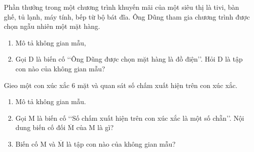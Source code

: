 \begin{vd}%
	Phần thưởng trong một chương trình khuyến mãi của một siêu thị là tivi, bàn ghế, tủ lạnh, máy tính, bếp từ bộ bát đĩa. Ông Dũng tham gia chương trình được chọn ngẫu nhiên một mặt hàng.
	\begin{enumerate}
		\item Mô tả không gian mẫu,
		\item Gọi $ \mathrm{D} $ là biến cố \lq\lq  Ông Dũng được chọn mặt hàng là đồ điện\rq\rq. Hỏi $ \mathrm{D} $ là tập con nào của không gian mẫu?
	\end{enumerate}
\end{vd}

\begin{vd}%
	Gieo một con xúc xắc $ 6 $ mặt và quan sát số chấm xuất hiện trên con xúc xắc.
	\begin{enumerate}
		\item Mô tả không gian mẫu.
		\item Gọi $ \mathrm{M} $ là biến cố \lq\lq  Số chấm xuất hiện trên con xúc xắc là một số chẵn\rq\rq. Nội dung biến cố đối $\mathrm{\overline{M}}$ của $ \mathrm{M} $ là gì?
		\item Biến cố $ \mathrm{M} $ và $\mathrm{\overline{M}}$ là tập con nào của không gian mẫu?
	\end{enumerate}
\end{vd}

